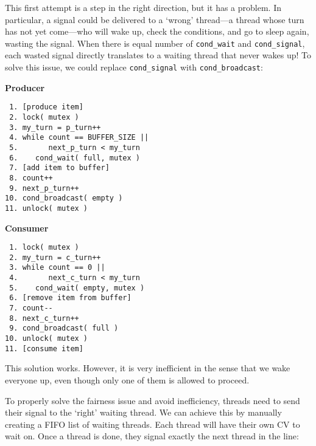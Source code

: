 This first attempt is a step in the right direction, but it has a problem.
In particular, a signal could be delivered to a `wrong' thread—a thread whose turn has not yet come—who will wake up, check the conditions, and go to sleep again, wasting the signal.
When there is equal number of \texttt{cond\_wait} and \texttt{cond\_signal}, each wasted signal directly translates to a waiting thread that never wakes up!
To solve this issue, we could replace \texttt{cond\_signal} with \texttt{cond\_broadcast}:

\begin{multicols}{2}
    \small
    \textbf{Producer}
    \begin{verbatim}
 1. [produce item]
 2. lock( mutex )
 3. my_turn = p_turn++
 4. while count == BUFFER_SIZE ||
 5.       next_p_turn < my_turn
 6.    cond_wait( full, mutex )
 7. [add item to buffer]
 8. count++
 9. next_p_turn++
10. cond_broadcast( empty )
11. unlock( mutex )
    \end{verbatim}
    \columnbreak
    \textbf{Consumer}\vspace{-2em}
    \begin{verbatim}
 1. lock( mutex )
 2. my_turn = c_turn++
 3. while count == 0 ||
 4.       next_c_turn < my_turn
 5.    cond_wait( empty, mutex )
 6. [remove item from buffer]
 7. count--
 8. next_c_turn++
 9. cond_broadcast( full )
10. unlock( mutex )
11. [consume item]
    \end{verbatim}
\end{multicols}
\vspace{-2em}

This solution works.
However, it is very inefficient in the sense that we wake everyone up, even though only one of them is allowed to proceed.

To properly solve the fairness issue and avoid inefficiency, threads need to send their signal to the `right' waiting thread.
We can achieve this by manually creating a FIFO list of waiting threads.
Each thread will have their own CV to wait on.
Once a thread is done, they signal exactly the next thread in the line:


